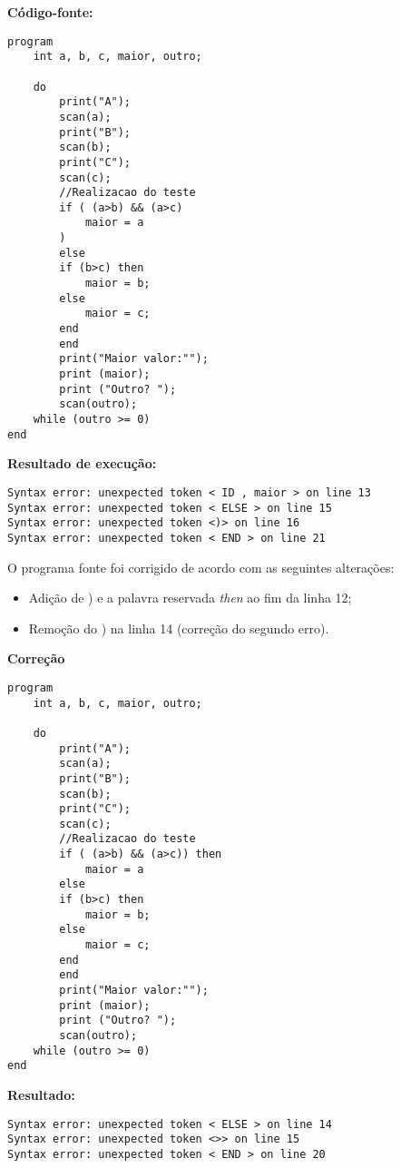 \textbf{Código-fonte:}

\begin{lstlisting}
program
	int a, b, c, maior, outro;

	do
		print("A");
		scan(a);
		print("B");
		scan(b);
		print("C");
		scan(c);
		//Realizacao do teste
		if ( (a>b) && (a>c)
			maior = a
		)
		else
		if (b>c) then
			maior = b;
		else
			maior = c;
		end
		end
		print("Maior valor:"");
		print (maior);
		print ("Outro? ");
		scan(outro);
	while (outro >= 0)
end
\end{lstlisting}

\textbf{Resultado de execução:}
        
\begin{lstlisting}
Syntax error: unexpected token < ID , maior > on line 13
Syntax error: unexpected token < ELSE > on line 15
Syntax error: unexpected token <)> on line 16
Syntax error: unexpected token < END > on line 21
\end{lstlisting}

O programa fonte foi corrigido de acordo com as seguintes alterações:

\begin{itemize}
    \item Adição de ) e a palavra reservada \textit{then} ao fim da linha 12;
    
    \item Remoção do ) na linha 14 (correção do segundo erro).
    
\end{itemize}

\textbf{Correção}
 \begin{lstlisting}
program
	int a, b, c, maior, outro;

	do
		print("A");
		scan(a);
		print("B");
		scan(b);
		print("C");
		scan(c);
		//Realizacao do teste
		if ( (a>b) && (a>c)) then
			maior = a
		else
		if (b>c) then
			maior = b;
		else
			maior = c;
		end
		end
		print("Maior valor:"");
		print (maior);
		print ("Outro? ");
		scan(outro);
	while (outro >= 0)
end

\end{lstlisting}

\textbf{Resultado:}

 \begin{lstlisting}
Syntax error: unexpected token < ELSE > on line 14
Syntax error: unexpected token <>> on line 15
Syntax error: unexpected token < END > on line 20\end{lstlisting}

